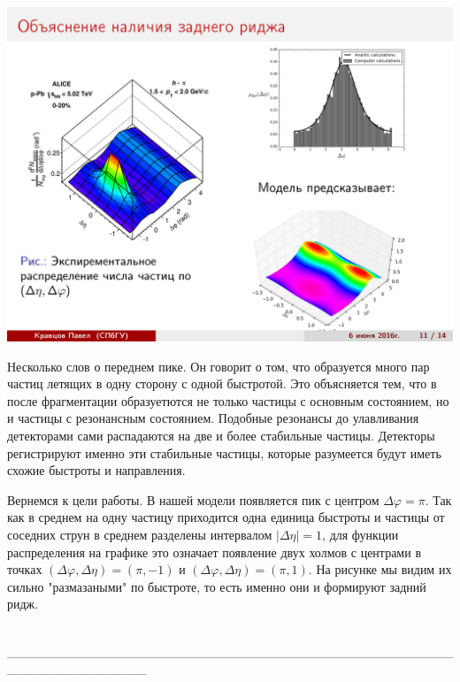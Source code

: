 \documentclass[14pt]{article}
\renewcommand{\phi}{\varphi}
\newcommand{\abs}[1]{\left| #1 \right|}
\renewcommand{\line}{\\ \_\_\_\_\_\_\_\_\_\_\_\_\_\_\_\_\_\_\_\_\_\_\_\_\_\_\_\_\_\_\_\_\_\_\_\_\_\_\_\_\_\_\_\_\_\_\_\_\_\_\_\_\_\_\_\_\_\_\_\_\_\_\_ \\ }
\begin{document}
\begin{minipage}[h]{0.3\linewidth}
\includegraphics[width=1\linewidth]{page-11.jpg}
\end{minipage}
\begin{minipage}[h]{0.65\linewidth}
Несколько слов о переднем пике. Он говорит о том, что образуется много пар частиц летящих в одну сторону с одной быстротой. Это объясняется тем, что в после фрагментации образуетются не только частицы с основным состоянием, но и частицы с резонансным состоянием. Подобные резонансы до улавливания детекторами сами распадаются на две и более стабильные частицы. Детекторы регистрируют именно эти стабильные частицы, которые разумеется будут иметь схожие быстроты и направления.

Вернемся к цели работы. 
В нашей модели появляется пик с центром $\Delta \phi = \pi$. Так как в среднем на одну частицу приходится одна единица быстроты и частицы от соседних струн в среднем разделены интервалом $\abs{\Delta \eta} = 1$,  для  функции распределения на графике это означает появление двух холмов с центрами в точках $(\Delta \phi , \Delta \eta) = (\pi, -1)$ и $(\Delta \phi , \Delta \eta) = (\pi, 1)$. На рисунке мы видим их сильно "размазаными" по быстроте, то есть именно они и формируют задний ридж.
\end{minipage}
\line
\end{document}
